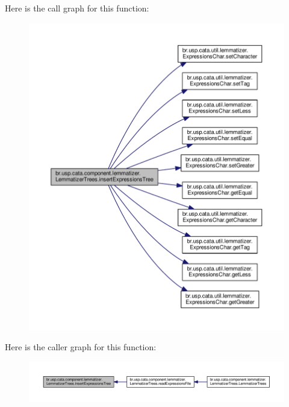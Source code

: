 Here is the call graph for this function\+:\nopagebreak
\begin{figure}[H]
\begin{center}
\leavevmode
\includegraphics[width=350pt]{classbr_1_1usp_1_1cata_1_1component_1_1lemmatizer_1_1_lemmatizer_trees_a6456da8739411ebc7fcaa1a37ed53199_cgraph}
\end{center}
\end{figure}




Here is the caller graph for this function\+:\nopagebreak
\begin{figure}[H]
\begin{center}
\leavevmode
\includegraphics[width=350pt]{classbr_1_1usp_1_1cata_1_1component_1_1lemmatizer_1_1_lemmatizer_trees_a6456da8739411ebc7fcaa1a37ed53199_icgraph}
\end{center}
\end{figure}


